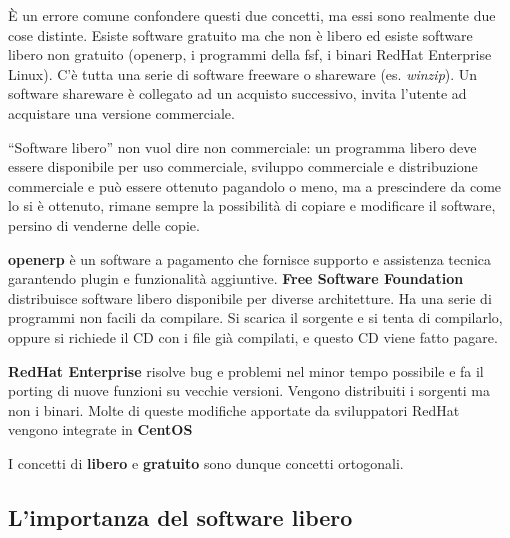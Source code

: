 È un errore comune confondere questi due concetti, ma essi sono realmente due cose distinte. Esiste software gratuito ma che non è libero ed esiste software libero non gratuito (openerp, i programmi della fsf, i binari RedHat Enterprise Linux). C'è tutta una serie di software freeware o shareware (es. \textit{winzip}). Un software shareware è collegato ad un acquisto successivo, invita l'utente ad acquistare una versione commerciale.

``Software libero'' non vuol dire non commerciale: un programma libero deve essere disponibile per uso commerciale, sviluppo commerciale e distribuzione commerciale e può essere ottenuto pagandolo o meno, ma a prescindere da come lo si è ottenuto, rimane sempre la possibilità di copiare e modificare il software, persino di venderne delle copie.

\textbf{openerp} è un software a pagamento che fornisce supporto e assistenza tecnica garantendo plugin e funzionalità aggiuntive. 
\textbf{Free Software Foundation} distribuisce software libero disponibile per diverse architetture. Ha una serie di programmi non facili da compilare. Si scarica il sorgente e si tenta di compilarlo, oppure si richiede il CD con i file già compilati, e questo CD viene fatto pagare.

\textbf{RedHat Enterprise} risolve bug e problemi nel minor tempo possibile e fa il porting di nuove funzioni su vecchie versioni. Vengono distribuiti i sorgenti ma non i binari. Molte di queste modifiche apportate da sviluppatori RedHat vengono integrate in \textbf{CentOS}

I concetti di \textbf{libero} e \textbf{gratuito} sono dunque concetti ortogonali.

\subsection{L'importanza del software libero}

